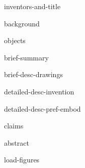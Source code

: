 \documentclass[english]{patentex}
\begin{document}
{inventors-and-title}

\maketitle

{background}

{objects}

{brief-summary}

{brief-desc-drawings}

{detailed-desc-invention}

{detailed-desc-pref-embod}

{claims}

{abstract}

{load-figures}
\end{document}
